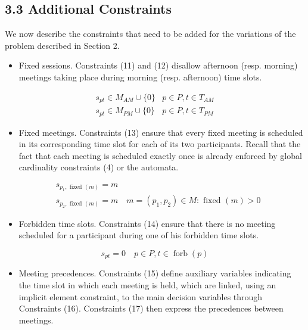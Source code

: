 \documentclass[10pt]{article}
\begin{document}
\subsection*{3.3 Additional Constraints}
We now describe the constraints that need to be added for the variations of the problem described in Section 2.

\begin{itemize}
  \item Fixed sessions. Constraints (11) and (12) disallow afternoon (resp. morning) meetings taking place during morning (resp. afternoon) time slots.
\end{itemize}

\[
\begin{array}{ll}
s_{p t} \in M_{A M} \cup\{0\} & p \in P, t \in T_{A M} \\
s_{p t} \in M_{P M} \cup\{0\} & p \in P, t \in T_{P M} \tag{12}
\end{array}
\]

\begin{itemize}
  \item Fixed meetings. Constraints (13) ensure that every fixed meeting is scheduled in its corresponding time slot for each of its two participants. Recall that the fact that each meeting is scheduled exactly once is already enforced by global cardinality constraints (4) or the automata.
\end{itemize}


\begin{align*}
& s_{p_{1}, \text { fixed }(m)}=m \\
& s_{p_{2}, \text { fixed }(m)}=m \quad m=\left(p_{1}, p_{2}\right) \in M: \text { fixed }(m)>0 \tag{13}
\end{align*}


\begin{itemize}
  \item Forbidden time slots. Constraints (14) ensure that there is no meeting scheduled for a participant during one of his forbidden time slots.
\end{itemize}


\begin{equation*}
s_{p t}=0 \quad p \in P, t \in \operatorname{forb}(p) \tag{14}
\end{equation*}


\begin{itemize}
  \item Meeting precedences. Constraints (15) define auxiliary variables indicating the time slot in which each meeting is held, which are linked, using an implicit element constraint, to the main decision variables through Constraints (16). Constraints (17) then express the precedences between meetings.
\end{itemize}
\end{document}

